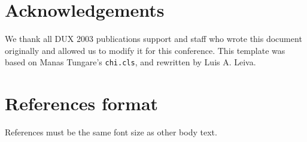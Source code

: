 \documentclass{chi-ext}
\begin{document}
\section{Acknowledgements}
We thank all DUX 2003 publications support and staff who wrote this document originally and allowed us to modify it for this conference.
This template was based on Manas Tungare's \texttt{chi.cls}, and rewritten by Luis A. Leiva.

\section{References format}
References must be the same font size as other body text.

\balance


\end{document}
